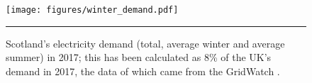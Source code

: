 \begin{figure}[htbp]
	\centering
	\texttt{[image: figures/winter\_demand.pdf]}
	\rule{\textwidth}{0.5pt} %
	\caption{Scotland's electricity demand (total, average winter and average summer) in 2017; this has been calculated as 8\% of the UK's demand in 2017, the data of which came from the GridWatch \citep{GridWatchnd}.}
	\label{fig:winter_demand}
\end{figure}
